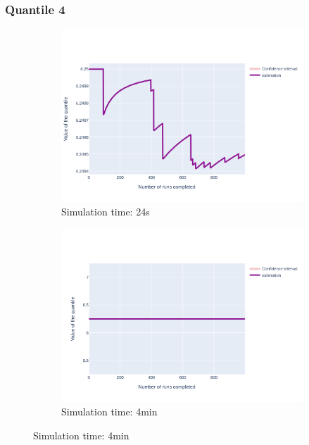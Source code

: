 \documentclass{article}
\begin{document}
\subsubsection{Quantile 4}
\begin{figure}[H]
    \centering
    \begin{subfigure}{.495\textwidth}
        \centering
        \includegraphics[width=\textwidth]{../fig/quantile4/TFTP4_DAT_24s.png}
        \caption{Simulation time: 24s}
        \vspace{.5cm}
    \end{subfigure}
    \begin{subfigure}{.495\textwidth}
        \centering
        \includegraphics[width=\textwidth]{../fig/quantile4/TFTP4 DAT_4mn.png}
        \caption{Simulation time: 4min}
        \vspace{.5cm}

\end{subfigure}
\end{figure}
\end{document}
